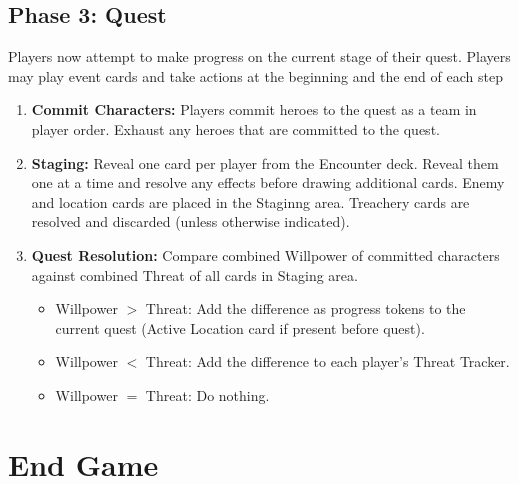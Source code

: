 \documentclass[12pt]{article}
\newenvironment{enumerateCustom}
{\begin{enumerate}
  \setlength{\itemsep}{1pt}
  \setlength{\parskip}{0pt}
  \setlength{\parsep}{0pt}}
{\end{enumerate}}
\newenvironment{itemizeCustom}
{\begin{itemize}
  \setlength{\itemsep}{1pt}
  \setlength{\parskip}{0pt}
  \setlength{\parsep}{0pt}}
{\end{itemize}}
\begin{document}
\begin{mdframed}[style = customFrame]
\begin{multicols*}{2}
\subsection*{Phase 3: Quest}
Players now attempt to make progress on the current stage of their quest. Players may play event cards and take actions at the beginning and the end of each step
\begin{enumerateCustom}
	\item \textbf{Commit Characters:} Players commit heroes to the quest as a team in player order. Exhaust any heroes that are committed to the quest.
	\item \textbf{Staging:}  Reveal one card per player from the Encounter deck. Reveal them one at a time and resolve any effects before drawing additional cards. Enemy and location cards are placed in the Staginng area. Treachery cards are resolved and discarded (unless otherwise indicated).
	\item \textbf{Quest Resolution:} Compare combined Willpower of committed characters against combined Threat of all cards in Staging area.
		\begin{itemizeCustom}
			\item Willpower $>$ Threat: Add the difference as progress tokens to the current quest (Active Location card if present before quest).
			\item Willpower $<$ Threat: Add the difference to each player's Threat Tracker.
			\item Willpower $=$ Threat: Do nothing.
		\end{itemizeCustom}
\end{enumerateCustom}

\section*{End Game}

\end{multicols*}
\end{mdframed}
\end{document}

